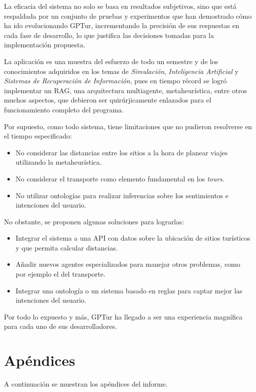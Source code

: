 \documentclass[10pt]{llncs}
\begin{document}
La eficacia del sistema no solo se basa en resultados subjetivos, sino que está respaldada por un conjunto de pruebas y experimentos que han demostrado cómo ha ido evolucionando GPTur, incrementando la precisión de sus respuestas en cada fase 
de desarrollo, lo que justifica las decisiones tomadas para la implementación propuesta.

La aplicación es una muestra del esfuerzo de todo un semestre y de los conocimientos adquiridos en los temas de \textit{Simulación}, \textit{Inteligencia Artificial} y \textit{Sistemas de Recuperación de Información}, pues en tiempo récord se logró 
implementar un RAG, una arquitectura multiagente, metaheurística, entre otros muchos aspectos, que debieron ser quirúrjicamente enlazados para el funcionamiento completo del programa.

Por supuesto, como todo sistema, tiene limitaciones que no pudieron resolverse en el tiempo especificado:
\begin{itemize}
    \item No considerar las distancias entre los sitios a la hora de planear viajes utilizando la metaheurística.
    \item No considerar el transporte como elemento fundamental en los \textit{tours}.
    \item No utilizar ontologías para realizar inferencias sobre los sentimientos e intenciones del usuario.
\end{itemize}

No obstante, se proponen algunas soluciones para lograrlas:
\begin{itemize}
    \item Integrar el sistema a una API con datos sobre la ubicación de sitios turísticos y que permita calcular distancias.
    \item Añadir nuevos agentes especializados para manejar otros problemas, como por ejemplo el del transporte.
    \item Integrar una ontología o un sistema basado en reglas para captar mejor las intenciones del usuario.
\end{itemize}

Por todo lo expuesto y más, GPTur ha llegado a ser una experiencia magnífica para cada uno de sus desarrolladores.

\vspace{\baselineskip}
\printbibliography

\newpage
\section*{Apéndices}
A continuación se muestran los apéndices del informe.
\appendix
\end{document}
